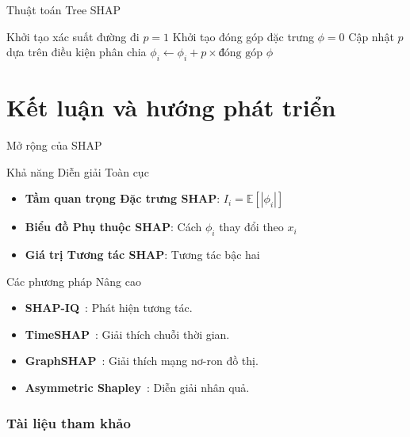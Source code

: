 \documentclass[notheorems, aspectratio=149]{beamer}
\begin{document}
\begin{frame}{Thuật toán Tree SHAP}
\begin{algorithm}[H]
\caption{Tree SHAP (Đơn giản hóa)}
\begin{algorithmic}[1]
\STATE Khởi tạo xác suất đường đi $p = 1$
\STATE Khởi tạo đóng góp đặc trưng $\phi = 0$
    \STATE Cập nhật $p$ dựa trên điều kiện phân chia
        \STATE $\phi_i \gets \phi_i + p \times \text{đóng góp}$
    \ENDFOR
\ENDFOR
\RETURN $\phi$
\end{algorithmic}
\end{algorithm}
\end{frame}

\section{Kết luận và hướng phát triển}

\begin{frame}{Mở rộng của SHAP}
\begin{block}{Khả năng Diễn giải Toàn cục}
\begin{itemize}
    \item \textbf{Tầm quan trọng Đặc trưng SHAP}: $I_i = \mathbb{E}[|\phi_i|]$
    \item \textbf{Biểu đồ Phụ thuộc SHAP}: Cách $\phi_i$ thay đổi theo $x_i$
    \item \textbf{Giá trị Tương tác SHAP}: Tương tác bậc hai
\end{itemize}
\end{block}

\begin{block}{Các phương pháp Nâng cao}
\begin{itemize}
    \item \textbf{SHAP-IQ}~\cite{janzing2020feature}: Phát hiện tương tác.
    \item \textbf{TimeSHAP}~\cite{yuan2022explainability}: Giải thích chuỗi thời gian.
    \item \textbf{GraphSHAP}~\cite{yuan2021shapley}: Giải thích mạng nơ-ron đồ thị.
    \item \textbf{Asymmetric Shapley}~\cite{bento2021timeshap}: Diễn giải nhân quả.
\end{itemize}
\end{block}
\end{frame}


\begin{frame}[allowframebreaks]
    \frametitle{Tài liệu tham khảo}
    \printbibliography
    \nocite{*}
\end{frame}
\end{document}
